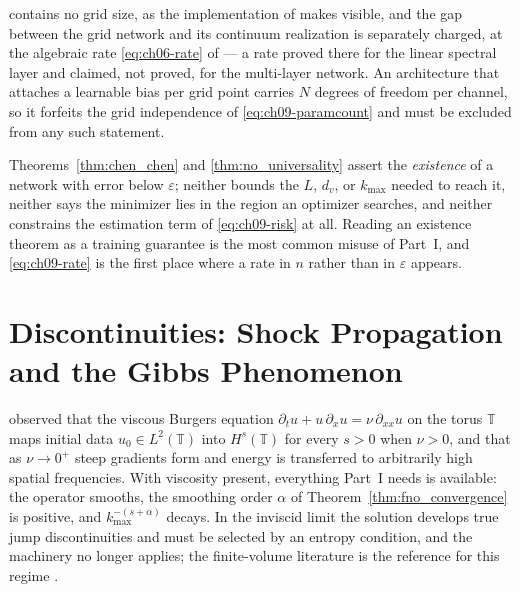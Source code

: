 contains no grid size, as the implementation of
 makes visible, and
the gap between the grid network and its continuum realization is separately
charged, at the algebraic rate \eqref{eq:ch06-rate} of
 --- a rate proved
there for the linear spectral layer and claimed, not proved, for the multi-layer
network. An architecture that attaches
a learnable bias per grid point carries $N$ degrees of freedom per
channel, so it forfeits the grid independence of \eqref{eq:ch09-paramcount} and
must be excluded from any such statement.

\begin{remark}
\label{rmk:ch09-universality}
Theorems~\ref{thm:chen_chen} and \ref{thm:no_universality} assert the
\emph{existence} of a network with error below $\varepsilon$; neither bounds the
$L$, $d_v$, or $k_{\max}$ needed to reach it, neither says the minimizer lies in
the region an optimizer searches, and neither constrains the estimation term of
\eqref{eq:ch09-risk} at all. Reading an existence theorem as a training
guarantee is the most common misuse of Part~I, and \eqref{eq:ch09-rate} is the
first place where a rate in $n$ rather than in $\varepsilon$ appears.
\end{remark}

\section{Discontinuities: Shock Propagation and the Gibbs Phenomenon}
\label{sec:ch09-shocks}

 observed that the
viscous Burgers equation $\partial_t u + u\,\partial_x u = \nu\,\partial_{xx}u$
on the torus $\mathbb{T}$ maps initial data $u_0\in L^2(\mathbb{T})$ into
$H^s(\mathbb{T})$ for every $s>0$ when $\nu>0$, and that as $\nu\to 0^+$ steep
gradients form and energy is transferred to arbitrarily high spatial
frequencies. With viscosity present, everything Part~I needs is available: the
operator smooths, the smoothing order $\alpha$ of
Theorem~\ref{thm:fno_convergence} is positive, and $k_{\max}^{-(s+\alpha)}$ decays.
In the inviscid limit the solution develops true
jump discontinuities and must be selected by an entropy condition, and the
machinery no longer applies; the finite-volume literature is the reference for
this regime \cite{leveque2002finite}.

